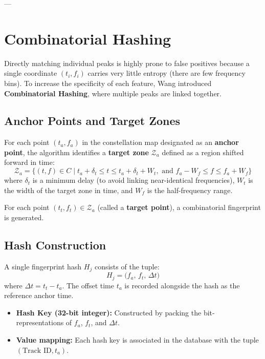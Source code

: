 \documentclass[11pt,journal,onecolumn]{IEEEtran}
\begin{document}
---

\section{Combinatorial Hashing}

Directly matching individual peaks is highly prone to false positives because a single coordinate $(t_i, f_i)$ carries very little entropy (there are few frequency bins). To increase the specificity of each feature, Wang introduced \textbf{Combinatorial Hashing}, where multiple peaks are linked together.

\subsection{Anchor Points and Target Zones}
For each point $(t_a, f_a)$ in the constellation map designated as an \textbf{anchor point}, the algorithm identifies a \textbf{target zone} $\mathcal{Z}_a$ defined as a region shifted forward in time:
\begin{equation}
\mathcal{Z}_a = \{ (t, f) \in C \mid t_a + \delta_t \le t \le t_a + \delta_t + W_t, \text{ and } f_a - W_f \le f \le f_a + W_f \}
\end{equation}
where $\delta_t$ is a minimum delay (to avoid linking near-identical frequencies), $W_t$ is the width of the target zone in time, and $W_f$ is the half-frequency range.

For each point $(t_t, f_t) \in \mathcal{Z}_a$ (called a \textbf{target point}), a combinatorial fingerprint is generated.

\subsection{Hash Construction}
A single fingerprint hash $H_{j}$ consists of the tuple:
\begin{equation}
H_{j} = \Big( f_a, \, f_t, \, \Delta t \Big)
\end{equation}
where $\Delta t = t_t - t_a$. The offset time $t_a$ is recorded alongside the hash as the reference anchor time.

\begin{itemize}
    \item \textbf{Hash Key (32-bit integer):} Constructed by packing the bit-representations of $f_a$, $f_t$, and $\Delta t$.
    \item \textbf{Value mapping:} Each hash key is associated in the database with the tuple $(\text{Track ID}, t_a)$.
\end{itemize}
\end{document}
